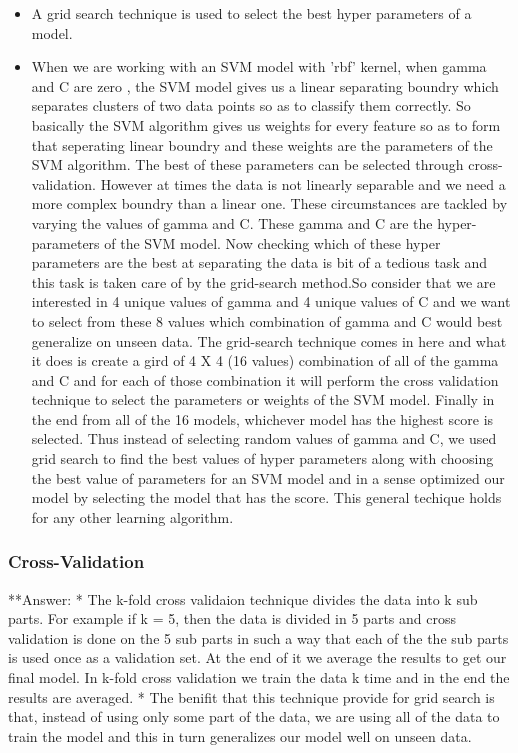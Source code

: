 \documentclass[11pt]{article}
\providecommand{\tightlist}{%
      \setlength{\itemsep}{0pt}\setlength{\parskip}{0pt}}
\begin{document}
    \begin{itemize}
\tightlist
\item
  A grid search technique is used to select the best hyper parameters of
  a model.
\item
  When we are working with an SVM model with 'rbf' kernel, when gamma
  and C are zero , the SVM model gives us a linear separating boundry
  which separates clusters of two data points so as to classify them
  correctly. So basically the SVM algorithm gives us weights for every
  feature so as to form that seperating linear boundry and these weights
  are the parameters of the SVM algorithm. The best of these parameters
  can be selected through cross-validation. However at times the data is
  not linearly separable and we need a more complex boundry than a
  linear one. These circumstances are tackled by varying the values of
  gamma and C. These gamma and C are the hyper-parameters of the SVM
  model. Now checking which of these hyper parameters are the best at
  separating the data is bit of a tedious task and this task is taken
  care of by the grid-search method.So consider that we are interested
  in 4 unique values of gamma and 4 unique values of C and we want to
  select from these 8 values which combination of gamma and C would best
  generalize on unseen data. The grid-search technique comes in here and
  what it does is create a gird of 4 X 4 (16 values) combination of all
  of the gamma and C and for each of those combination it will perform
  the cross validation technique to select the parameters or weights of
  the SVM model. Finally in the end from all of the 16 models, whichever
  model has the highest score is selected. Thus instead of selecting
  random values of gamma and C, we used grid search to find the best
  values of hyper parameters along with choosing the best value of
  parameters for an SVM model and in a sense optimized our model by
  selecting the model that has the score. This general techique holds
  for any other learning algorithm.
\end{itemize}

    \subsubsection{Cross-Validation}\label{cross-validation}

    **Answer: * The k-fold cross validaion technique divides the data into k
sub parts. For example if k = 5, then the data is divided in 5 parts and
cross validation is done on the 5 sub parts in such a way that each of
the the sub parts is used once as a validation set. At the end of it we
average the results to get our final model. In k-fold cross validation
we train the data k time and in the end the results are averaged. * The
benifit that this technique provide for grid search is that, instead of
using only some part of the data, we are using all of the data to train
the model and this in turn generalizes our model well on unseen data.
\end{document}

